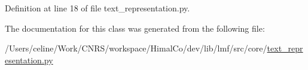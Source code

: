 Definition at line 18 of file text\+\_\+representation.\+py.



The documentation for this class was generated from the following file\+:\begin{DoxyCompactItemize}
\item 
/\+Users/celine/\+Work/\+C\+N\+R\+S/workspace/\+Himal\+Co/dev/lib/lmf/src/core/\hyperlink{text__representation_8py}{text\+\_\+representation.\+py}\end{DoxyCompactItemize}
